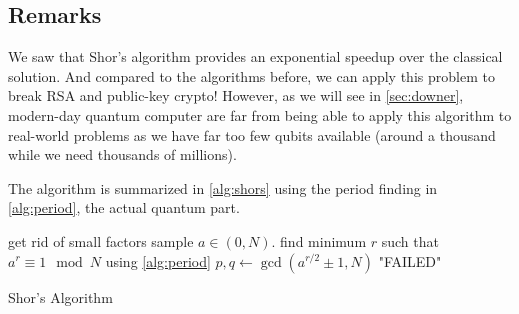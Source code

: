 		\subsection{Remarks}
			We saw that Shor's algorithm provides an exponential speedup over the classical solution. And compared to the algorithms before, we can apply this problem to break RSA and public-key crypto! However, as we will see in \autoref{sec:downer}, modern-day quantum computer are far from being able to apply this algorithm to real-world problems as we have far too few qubits available (around a thousand while we need thousands of millions).

			The algorithm is summarized in \autoref{alg:shors} using the period finding in \autoref{alg:period}, the actual quantum part.

			\begin{algorithm}  \DontPrintSemicolon
				get rid of small factors \;
				sample \( a \in (0, N) \). \;
				find minimum \(r\) such that \( a^r \equiv 1  \mod N \) using \autoref{alg:period}  \quad{}
				\( p, q \gets \gcd(a^{r/2} \pm 1, N) \) \;
				\Return "FAILED" \;
				\caption{Shor's Algorithm}
				\label{alg:shors}
			\end{algorithm}

